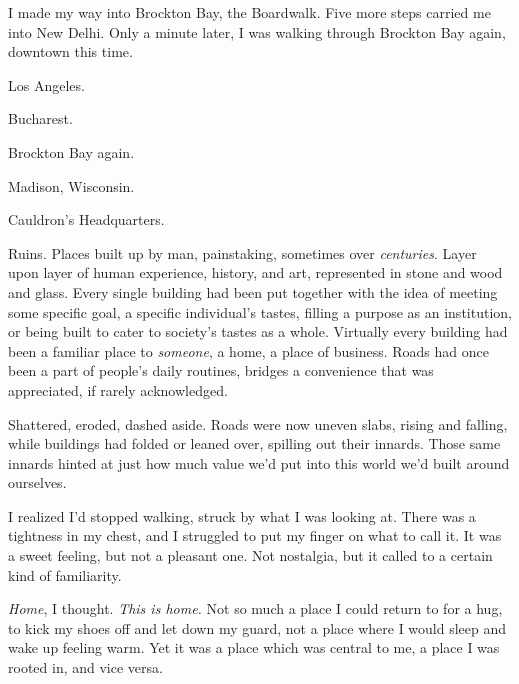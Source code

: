





I made my way into Brockton Bay, the Boardwalk.  Five more steps carried me into New Delhi.  Only a minute later, I was walking through Brockton Bay again, downtown this time.



Los Angeles.



Bucharest.



Brockton Bay again.



Madison, Wisconsin.



Cauldron's Headquarters.



Ruins.  Places built up by man, painstaking, sometimes over \emph{centuries}.  Layer upon layer of human experience, history, and art, represented in stone and wood and glass.  Every single building had been put together with the idea of meeting some specific goal, a specific individual's tastes, filling a purpose as an institution, or being built to cater to society's tastes as a whole.  Virtually every building had been a familiar place to \emph{someone}, a home, a place of business.  Roads had once been a part of people's daily routines, bridges a convenience that was appreciated, if rarely acknowledged.



Shattered, eroded, dashed aside.  Roads were now uneven slabs, rising and falling, while buildings had folded or leaned over, spilling out their innards.  Those same innards hinted at just how much value we'd put into this world we'd built around ourselves.



I realized I'd stopped walking, struck by what I was looking at.  There was a tightness in my chest, and I struggled to put my finger on what to call it.  It was a sweet feeling, but not a pleasant one.  Not nostalgia, but it called to a certain kind of familiarity.



\emph{Home}, I thought.  \emph{This is home.}  Not so much a place I could return to for a hug, to kick my shoes off and let down my guard, not a place where I would sleep and wake up feeling warm.  Yet it was a place which was central to me, a place I was rooted in, and vice versa.



